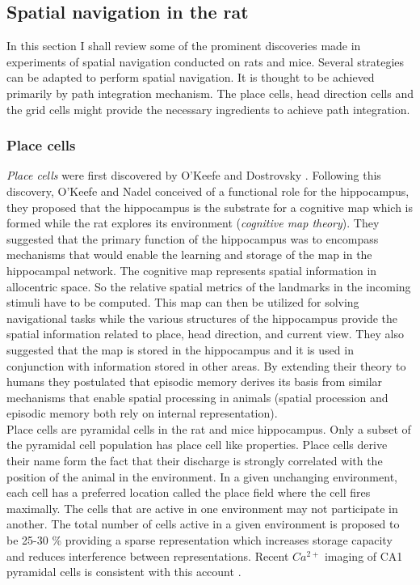 \subsection{Spatial navigation in the rat}
In this section I shall review some of the prominent discoveries made in experiments of spatial navigation conducted on rats and mice. Several strategies can be adapted to perform spatial navigation. It is thought to be achieved primarily by path integration mechanism. The place cells, head direction cells and the grid cells might provide the necessary ingredients to achieve path integration. 

\subsubsection{Place cells}
\label{placeCells}
 \emph{Place cells} were first discovered by O'Keefe and Dostrovsky \cite{O'Keefe1971a}. Following this discovery, O'Keefe and Nadel \cite{Street} conceived of a functional role for the hippocampus, they proposed that the hippocampus is the substrate for a cognitive map which is formed while the rat explores its environment (\emph{cognitive map theory}). They suggested that the primary function of the hippocampus was to encompass mechanisms that would enable the learning and storage of the map in the hippocampal network. The cognitive map represents spatial information in allocentric space. So the relative spatial metrics of the landmarks in the incoming stimuli have to be computed. This map can then be utilized for solving navigational tasks while the various structures of the hippocampus provide the spatial information related to place, head direction, and current view. They also suggested that the map is stored in the hippocampus and it is used in conjunction with information stored in other areas. By extending their theory to humans they postulated that episodic memory derives its basis from similar mechanisms that enable spatial processing in animals (spatial procession and  episodic memory both rely on internal representation). \\ 
Place cells are pyramidal cells in the rat and mice hippocampus. Only a subset of the pyramidal cell population has place cell like properties. Place cells derive their name form the fact that their discharge is strongly correlated with the position of the animal in the environment. In a given unchanging environment, each cell has a preferred location called the place field where the cell fires maximally.  The cells that are active in one environment may not participate in another. The total number of cells active in a given environment is proposed to be 25-30 \% providing a sparse representation which increases storage capacity and reduces interference between representations\cite{Marr2007, Wilson1993a}. Recent $Ca^{2+}$ imaging of CA1 pyramidal cells is consistent with this account \cite{Ziv2013}.
